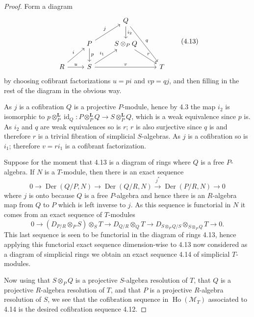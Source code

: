 \documentclass[10pt,reqno]{amsart}
\DeclareMathOperator{\Der}{Der}
\DeclareMathOperator{\Ho}{Ho}
\DeclareMathOperator{\id}{id}
\newcommand{\lra}{\longrightarrow}
\newcommand{\cat}{\mathcal}
\newcommand{\M}{\cat{M}}
\renewcommand{\L}{\mathbf{L}}
\begin{document}
\begin{proof}
Form a diagram
\[
  \begin{tikzcd}
    & & Q\ar[d,"i_2"]\ar[rdd,"q"]\\
    & P\ar[ur,"j"]\ar[d,"p"] & S\otimes_P Q\ar[rd,"r"]\\
    R\ar[ur,"i"]\ar[r,"u"] & S\ar[ur,"i_1"]\ar[rr,"v"] & & T
  \end{tikzcd}
  \tag{4.13}
\]
by choosing cofibrant factorizations $u=pi$ and $vp=qj$, and then filling in the rest of the diagram in the obvious
way.

As $j$ is a cofibration $Q$ is a projective $P$-module, hence by 4.3 the map $i_2$ is isomorphic to
$p\otimes_P^\L\id_Q:P\otimes_P^\L Q\to S\otimes_P^\L Q$, which is a weak equivalence since $p$ is. As $i_2$ and
$q$ are weak equivalences so is $r$; $r$ is also surjective since $q$ is and therefore $r$ is a trivial fibration
of simplicial $S$-algebras. As $j$ is a cofibration so is $i_1$; therefore $v=ri_1$ is a cofibrant factorization.

Suppose for the moment that 4.13 is a diagram of rings where $Q$ is a free $P$-algebra. If $N$ is a $T$-module,
then there is an exact sequence
\[
  0\lra\Der(Q/P,N)\lra\Der(Q/R,N)\xrightarrow{\ j^\ast\ }\Der(P/R,N)\lra 0
\]
where $j$ is onto because $Q$ is a free $P$-algebra and hence there is an $R$-algebra map from $Q$ to $P$ which
is left inverse to $j$. As this sequence is functorial in $N$ it comes from an exact sequence of $T$-modules
\[
  0\lra(D_{P/R}\otimes_P S)\otimes_S T\lra D_{Q/R}\otimes_Q T\lra D_{S\otimes_P Q/S}\otimes_{S\otimes_P Q}T\lra 0.\tag{4.14}
\]
This last sequence is seen to be functorial in the diagram of rings 4.13, hence applying this functorial exact sequence
dimension-wise to 4.13 now considered as a diagram of simplicial rings we obtain an exact sequence 4.14 of simplicial
$T$-modules.

Now using that $S\otimes_P Q$ is a projective $S$-algebra resolution of $T$, that $Q$ is a projective $R$-algebra resolution
of $T$, and that $P$ is a projective $R$-algebra resolution of $S$, we see that the cofibration sequence in $\Ho(\M_T)$
associated to 4.14 is the desired cofibration sequence 4.12.


\end{proof}
\end{document}
